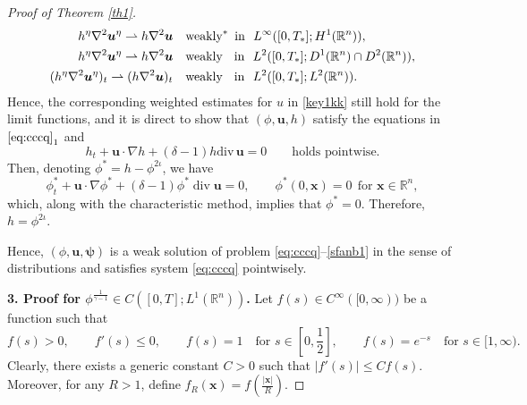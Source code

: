 \documentclass[11pt,reqno]{amsart}
\DeclareMathOperator{\diver}{\mathrm{div}}
\numberwithin{rk}{section}
\numberwithin{prop}{section}
\numberwithin{mydef}{section}
\numberwithin{lem}{section}
\numberwithin{equation}{section}
\numberwithin{thm}{section}
\begin{document}
\begin{proof}[Proof of {\rm Theorem \ref{th1}}]
\begin{equation*}
\begin{aligned}
h^\eta\nabla^2 \boldsymbol{u}^\eta\rightharpoonup h\nabla^2\boldsymbol{u}\quad &\text{weakly}^*\ \ \!\text{in}\ \ L^\infty([0,T_*];H^1(\mathbb{R}^n)),\\
h^\eta\nabla^2\boldsymbol{u}^\eta\rightharpoonup  h\nabla^2\boldsymbol{u} \quad &\text{weakly}\ \ \hspace{1.5mm} \!\text{in}\ \ L^2([0,T_*];D^1(\mathbb{R}^n) \cap D^2(\mathbb{R}^n)),\\
(h^\eta\nabla^2 \boldsymbol{u}^\eta)_t\rightharpoonup (h\nabla^2\boldsymbol{u})_t\quad &\text{weakly}\ \ \hspace{1.5mm} \!\text{in}\ \ L^2([0,T_*];L^2(\mathbb{R}^n)).
\end{aligned}
\end{equation*}
Hence, the corresponding weighted estimates for $u$ in \eqref{key1kk} still hold for the limit functions, and it is direct to show that $(\phi,\boldsymbol{u},h)$ satisfy the equations in $\eqref{eq:cccq}_1$ and 
\begin{equation*}
h_t+\boldsymbol{u}\cdot \nabla h+(\delta-1)h\mathrm{div}\,\boldsymbol{u}=0\qquad \text{holds pointwise}.
\end{equation*}
Then, denoting $\phi^*=h-\phi^{2\iota}$, we have
\begin{equation*}
\phi^*_t+\boldsymbol{u}\cdot \nabla \phi^*+(\delta-1)\phi^*\diver\boldsymbol{u}=0,\qquad \phi^*(0,\boldsymbol{x})=0 \ \  \text{for $\boldsymbol{x}\in \mathbb{R}^n$},
\end{equation*}
which, along with the characteristic method, implies that $\phi^*=0$. 
Therefore, $h=\phi^{2\iota}$.


Hence, $(\phi,\boldsymbol{u},\boldsymbol{\psi})$ is a weak solution of  problem \eqref{eq:cccq}{\rm--}\eqref{sfanb1}  in the sense of distributions and satisfies system \eqref{eq:cccq} pointwisely. 

\smallskip
\textbf{3. Proof for $\phi^\frac{1}{\gamma-1}\in C([0,T];L^1(\mathbb{R}^n))$.}
Let $f(s)\in C^\infty([0,\infty))$ be a function such that
\begin{equation*}
f(s)>0,\qquad f'(s)\leq 0,\qquad f(s)= 1 \quad\text{for $s\in [0,\frac{1}{2}]$}, \qquad f(s)=e^{-s} \quad\text{for $s\in [1,\infty)$}.
\end{equation*}
Clearly, there exists a generic constant $C >0$ such that  $|f'(s)| \le C f(s)$. Moreover, for any $R>1$, define $f_R(\boldsymbol{x})=f (\tfrac{|\boldsymbol{x}|}{R})$. 



\end{proof}
\end{document}
